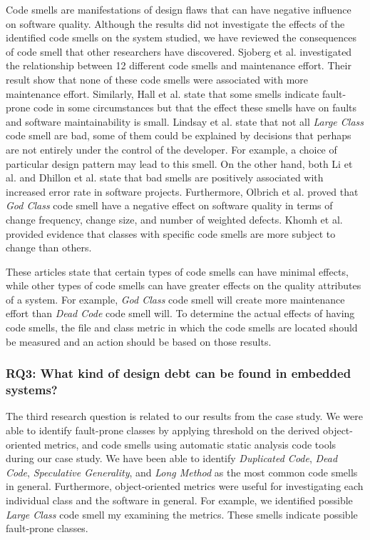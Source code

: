 Code smells are manifestations of design flaws that can have negative influence on software quality. Although the results did not investigate the effects of the identified code smells on the system studied, we have reviewed the consequences of code smell that other researchers have discovered. Sjoberg et al.\cite{sjoberg2013quantifying} investigated the relationship between 12 different code smells and maintenance effort. Their result show that none of these code smells were associated with more maintenance effort. Similarly, Hall et al.\cite{hall2014some} state that some smells indicate fault-prone code in some circumstances but that the effect these smells have on faults and software maintainability is small. Lindsay et al.\cite{lindsay2010does} state that not all \textit{Large Class} code smell are bad, some of them could be explained by decisions that perhaps are not entirely under the control of the developer. For example, a choice of particular design pattern may lead to this smell. On the other hand, both Li et al.\cite{li2007empirical} and Dhillon et al.\cite{dhillon2012can} state that bad smells are positively associated with increased error rate in software projects. Furthermore, Olbrich et al.\cite{olbrich2010all} proved that \textit{God Class} code smell have a negative effect on software quality in terms of change frequency, change size, and number of weighted defects. Khomh et al.\cite{khomh2009exploratory} provided evidence that classes with specific code smells are more subject to change than others. 

These articles state that certain types of code smells can have minimal effects, while other types of code smells can have greater effects on the quality attributes of a system. For example, \textit{God Class} code smell will create more maintenance effort than \textit{Dead Code} code smell will. To determine the actual effects of having code smells, the file and class metric in which the code smells are located should be measured and an action should be based on those results.


\subsubsection{RQ3: What kind of design debt can be found in embedded systems?} 
The third research question is related to our results from the case study. We were able to identify fault-prone classes by applying threshold on the derived object-oriented metrics, and code smells using automatic static analysis code tools during our case study. We have been able to identify \textit{Duplicated Code}, \textit{Dead Code}, \textit{Speculative Generality}, and \textit{Long Method} as the most common code smells in general. Furthermore, object-oriented metrics were useful for investigating each individual class and the software in general. For example, we identified possible \textit{Large Class} code smell my examining the metrics. These smells indicate possible fault-prone classes.

